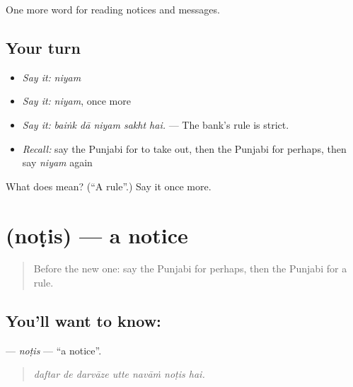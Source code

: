 \begin{grammarlens}[title={What you've built}]
One more word for reading notices and messages.
\end{grammarlens}

\subsection*{Your turn}
\begin{itemize}
\raggedright
  \item \emph{Say it:} \emph{niyam}
  \item \emph{Say it:} \emph{niyam}, once more
  \item \emph{Say it:} \emph{baiṅk dā niyam sakht hai.} — The bank's rule is strict.
  \item \emph{Recall:} say the Punjabi for to take out, then the Punjabi for perhaps, then say \emph{niyam} again
\end{itemize}

\begin{tcolorbox}[breakable,colback=teal!4,colframe=teal!35!black,title={Before you move on}]
What does  mean? (\textquotedblleft{}A rule\textquotedblright{}.) Say it once more.
\end{tcolorbox}
\section[\texorpdfstring{\pa{ਨੋਟਿਸ} (noṭis)}{ਨੋਟਿਸ (noṭis)}]{ (noṭis) — a notice}

\label{lesson:PA-C253-notis}



\begin{quote}
Before the new one: say the Punjabi for perhaps, then the Punjabi for a rule.
\end{quote}

\subsection*{You'll want to know: }
\textbf{} — \emph{noṭis} — \textquotedblleft{}a notice\textquotedblright{}.

\begin{quote}
      
\end{quote}

\begin{quote}
\emph{daftar de darvāze utte navāṁ noṭis hai.}
\end{quote}

